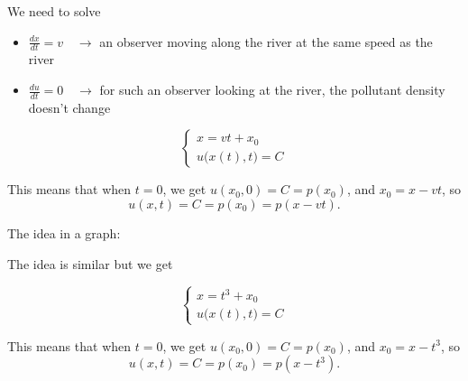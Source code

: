 \documentclass{workbook}
\begin{document}
\begin{solution}

\begin{slide}
\begin{parts}

	\item We need to solve
	
	\begin{itemize}
		\item $	\frac{dx}{dt} = v \quad \to$  an observer moving along the river at the same speed as the river
		\item $ \frac{du}{dt} = 0 \quad \to $ for such an observer looking at the river, the pollutant density doesn't change
	\end{itemize}

		\[
	\begin{cases}
		x = vt + x_0 \\
		u\big(x(t),t\big) = C
	\end{cases}
	\]
	
	This means that when $t=0$, we get $u(x_0,0) = C = p(x_0)$, and $x_0 = x - vt$, so
	\[
	u(x,t) = C = p(x_0) = p(x-vt).
	\]
	
	The idea in a graph:
	\begin{center}
	\end{center}

	\item The idea is similar but we get 
	
			\[
	\begin{cases}
		x = t^3 + x_0 \\
		u\big(x(t),t\big) = C
	\end{cases}
	\]
	
	This means that when $t=0$, we get $u(x_0,0) = C = p(x_0)$, and $x_0 = x - t^3$, so
	\[
	u(x,t) = C = p(x_0) = p(x-t^3).
	\]

		
\end{parts}

\end{slide}
	
\end{solution}
\end{document}
